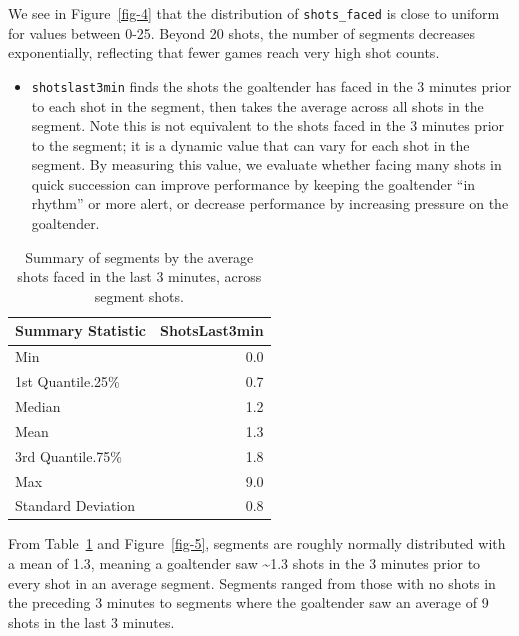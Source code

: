 \documentclass[
  letterpaper,
  DIV=11,
  numbers=noendperiod]{scrartcl}
\providecommand{\tightlist}{%
  \setlength{\itemsep}{0pt}\setlength{\parskip}{0pt}}\usepackage{longtable,booktabs,array}
\begin{document}
We see in Figure~\ref{fig-4} that the distribution of
\texttt{shots\_faced} is close to uniform for values between 0-25.
Beyond 20 shots, the number of segments decreases exponentially,
reflecting that fewer games reach very high shot counts.

\begin{itemize}
\tightlist
\item
  \texttt{shotslast3min} finds the shots the goaltender has faced in the
  3 minutes prior to each shot in the segment, then takes the average
  across all shots in the segment. Note this is not equivalent to the
  shots faced in the 3 minutes prior to the segment; it is a dynamic
  value that can vary for each shot in the segment. By measuring this
  value, we evaluate whether facing many shots in quick succession can
  improve performance by keeping the goaltender ``in rhythm'' or more
  alert, or decrease performance by increasing pressure on the
  goaltender.
\end{itemize}

\begin{longtable}[]{@{}lr@{}}

\caption{\label{tbl-7}Summary of segments by the average shots faced in
the last 3 minutes, across segment shots.}

\tabularnewline

\toprule\noalign{}
Summary Statistic & ShotsLast3min \\
\midrule\noalign{}
\endhead
\bottomrule\noalign{}
\endlastfoot
Min & 0.0 \\
1st Quantile.25\% & 0.7 \\
Median & 1.2 \\
Mean & 1.3 \\
3rd Quantile.75\% & 1.8 \\
Max & 9.0 \\
Standard Deviation & 0.8 \\

\end{longtable}

From Table~\ref{tbl-7} and Figure~\ref{fig-5}, segments are roughly
normally distributed with a mean of 1.3, meaning a goaltender saw
\textasciitilde1.3 shots in the 3 minutes prior to every shot in an
average segment. Segments ranged from those with no shots in the
preceding 3 minutes to segments where the goaltender saw an average of 9
shots in the last 3 minutes.
\end{document}
